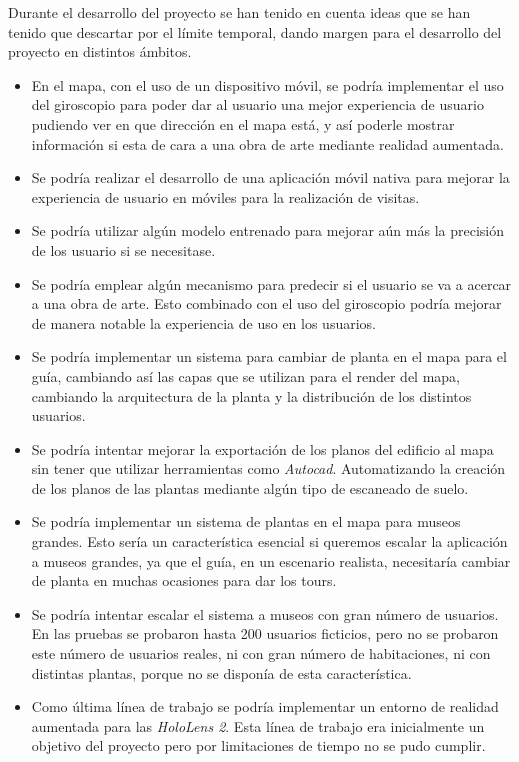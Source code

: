 Durante el desarrollo del proyecto se han tenido en cuenta ideas que se han tenido que descartar por el límite temporal, dando margen para el desarrollo del proyecto en distintos ámbitos.

\begin{itemize}
    \item En el mapa, con el uso de un dispositivo móvil, se podría implementar el uso del giroscopio para poder dar al usuario una mejor experiencia de usuario pudiendo ver en que dirección en el mapa está, y así poderle mostrar información si esta de cara a una obra de arte mediante realidad aumentada.
    \item Se podría realizar el desarrollo de una aplicación móvil nativa para mejorar la experiencia de usuario en móviles para la realización de visitas.
    \item Se podría utilizar algún modelo entrenado para mejorar aún más la precisión de los usuario si se necesitase.
    \item Se podría emplear algún mecanismo para predecir si el usuario se va a acercar a una obra de arte. Esto combinado con el uso del giroscopio podría mejorar de manera notable la experiencia de uso en los usuarios.
    \item Se podría implementar un sistema para cambiar de planta en el mapa para el guía, cambiando así las capas que se utilizan para el render del mapa, cambiando la arquitectura de la planta y la distribución de los distintos usuarios.
    
    \item Se podría intentar mejorar la exportación de los planos del edificio al mapa sin tener que utilizar herramientas como \textit{Autocad}. Automatizando la creación de los planos de las plantas mediante algún tipo de escaneado de suelo.
    \item Se podría implementar un sistema de plantas en el mapa para museos grandes. Esto sería un característica esencial si queremos escalar la aplicación a museos grandes, ya que el guía, en un escenario realista, necesitaría cambiar de planta en muchas ocasiones para dar los tours.
    \item Se podría intentar escalar el sistema a museos con gran número de usuarios. En las pruebas se probaron hasta 200 usuarios ficticios, pero no se probaron este número de usuarios reales, ni con gran número de habitaciones, ni con distintas plantas, porque no se disponía de esta característica.
    
    \item Como última línea de trabajo se podría implementar un entorno de realidad aumentada para las \textit{HoloLens 2}. Esta línea de trabajo era inicialmente un objetivo del proyecto pero por limitaciones de tiempo no se pudo cumplir.

\end{itemize}